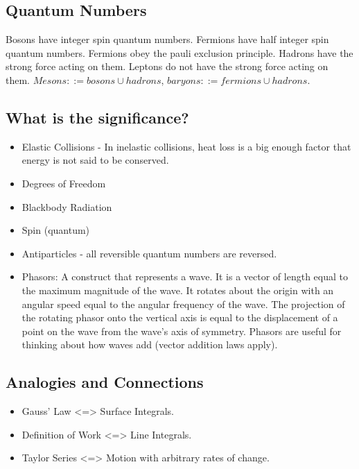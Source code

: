 \documentclass{article}
\begin{document}
    \subsection*{Quantum Numbers}
    Bosons have integer spin quantum numbers.
    Fermions have half integer spin quantum numbers.
    Fermions obey the pauli exclusion principle.
    Hadrons have the strong force acting on them.
    Leptons do not have the strong force acting on them.
    $Mesons ::= bosons \cup hadrons$, $baryons ::= fermions \cup hadrons$.
    \subsection*{What is the significance?}
        \begin{itemize}[leftmargin=\lindent]
            \item Elastic Collisions - In inelastic collisions, heat loss is a big enough factor
                  that energy is not said to be conserved.
            \item Degrees of Freedom
            \item Blackbody Radiation
            \item Spin (quantum)
            \item Antiparticles - all reversible quantum numbers are reversed.
            \item Phasors: A construct that represents a wave. It is a vector of length equal to the
            maximum magnitude of the wave. It rotates about the origin with an angular speed equal to
            the angular frequency of the wave. The projection of the rotating phasor onto the vertical
            axis is equal to the displacement of a point on the wave from the wave's axis of symmetry.
            Phasors are useful for thinking about how waves add (vector addition laws apply).
        \end{itemize}
    \subsection*{Analogies and Connections}
        \begin{itemize}[leftmargin=\lindent]
            \item Gauss' Law <=> Surface Integrals.
            \item Definition of Work <=> Line Integrals.
            \item Taylor Series <=> Motion with arbitrary rates of change.
        \end{itemize}
\end{document}
